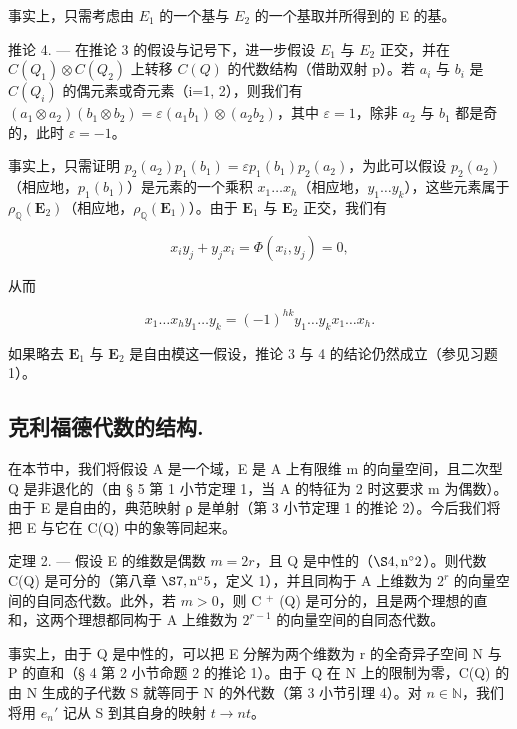   事实上，只需考虑由 \(E_{1}\) 的一个基与 \(E_{2}\) 的一个基取并所得到的 E 的基。

推论 4. --- 在推论 3 的假设与记号下，进一步假设 \(E_{1}\) 与 \(E_{2}\) 正交，并在 \(C(Q_{1})\otimes C(Q_{2})\) 上转移 \(C(Q)\) 的代数结构（借助双射 p）。若 \(a_{i}\) 与 \(b_{i}\) 是 \(C(Q_{i})\) 的偶元素或奇元素（i=1, 2），则我们有 \((a_{1}\otimes a_{2})(b_{1}\otimes b_{2})=\varepsilon(a_{1}b_{1})\otimes(a_{2}b_{2})\)，其中 \(\varepsilon=1\)，除非 \(a_{2}\) 与 \(b_{1}\) 都是奇的，此时 \(\varepsilon=-1\)。

  事实上，只需证明 \(p_2(a_2)p_1(b_1) = \varepsilon p_1(b_1)p_2(a_2)\)，为此可以假设 \(p_2(a_2)\)（相应地，\(p_1(b_1)\)）是元素的一个乘积 \(x_1 \ldots x_h\)（相应地，\(y_1 \ldots y_k\)），这些元素属于 \(\rho_{\mathbb{Q}}(\mathbf{E}_2)\)（相应地，\(\rho_{\mathbb{Q}}(\mathbf{E}_1)\)）。由于 \(\mathbf{E}_1\) 与 \(\mathbf{E}_2\) 正交，我们有

\[
x _ {i} y _ {j} + y _ {j} x _ {i} = \Phi (x _ {i}, y _ {j}) = 0,
\]

  从而

\[
x _ {1} \dots x _ {h} y _ {1} \dots y _ {k} = (- 1) ^ {h k} y _ {1} \dots y _ {k} x _ {1} \dots x _ {h}.
\]

  如果略去 \(\mathbf{E}_1\) 与 \(\mathbf{E}_2\) 是自由模这一假设，推论 3 与 4 的结论仍然成立（参见习题 1）。

\subsection{克利福德代数的结构.}

  在本节中，我们将假设 A 是一个域，E 是 A 上有限维 m 的向量空间，且二次型 Q 是非退化的（由 § 5 第 1 小节定理 1，当 A 的特征为 2 时这要求 m 为偶数）。由于 E 是自由的，典范映射 ρ 是单射（第 3 小节定理 1 的推论 2）。今后我们将把 E 与它在 C(Q) 中的象等同起来。

定理 2. --- 假设 E 的维数是偶数 \(m = 2r\)，且 Q 是中性的（\(\S 4, \text{n}^{\circ} 2\)）。则代数 C(Q) 是可分的（第八章 \(\S 7, \text{n}^{\circ} 5\)，定义 1），并且同构于 A 上维数为 \(2^{r}\) 的向量空间的自同态代数。此外，若 \(m > 0\)，则 C \(^{+}\) (Q) 是可分的，且是两个理想的直和，这两个理想都同构于 A 上维数为 \(2^{r-1}\) 的向量空间的自同态代数。

  事实上，由于 Q 是中性的，可以把 E 分解为两个维数为 r 的全奇异子空间 N 与 P 的直和（§ 4 第 2 小节命题 2 的推论 1）。由于 Q 在 N 上的限制为零，C(Q) 的由 N 生成的子代数 S 就等同于 N 的外代数（第 3 小节引理 4）。对 \(n \in \mathbb{N}\)，我们将用 \(e_n'\) 记从 S 到其自身的映射 \(t \to nt\)。

